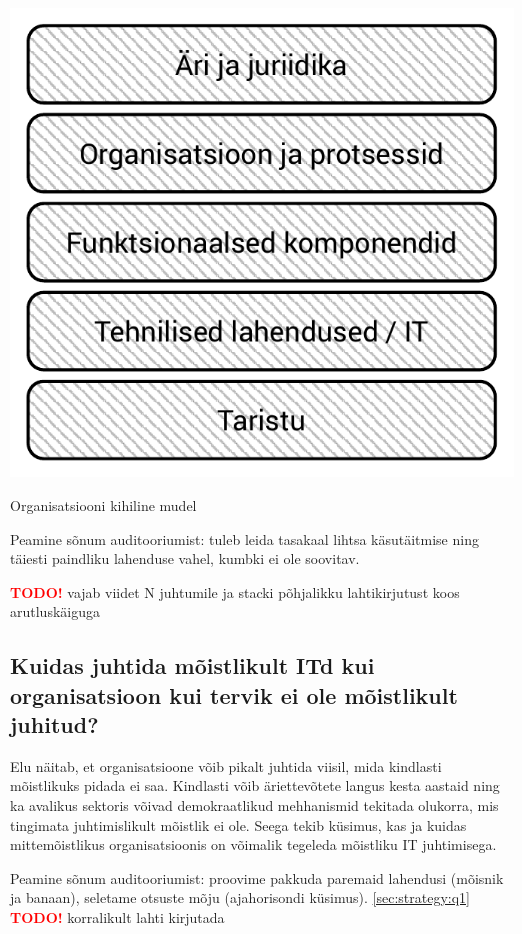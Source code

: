 \documentclass{tufte-book}
\newcommand{\TODO}{\textcolor{red}{\bf TODO!}\xspace}
\begin{document}
\begin{marginfigure}
	\begin{center}
		\includegraphics[width=\linewidth]{stack.pdf}
		\caption{Organisatsiooni kihiline mudel}
		\label{fig:stack}
	\end{center}
\end{marginfigure}

Peamine sõnum auditooriumist: tuleb leida tasakaal lihtsa käsutäitmise ning täiesti paindliku lahenduse vahel, kumbki ei ole soovitav.

\TODO vajab viidet N juhtumile ja stacki põhjalikku lahtikirjutust koos arutluskäiguga

\subsection{Kuidas juhtida mõistlikult ITd kui organisatsioon kui tervik ei ole mõistlikult juhitud?}
\label{sec:strategy:q3}
Elu näitab, et organisatsioone võib pikalt juhtida viisil, mida kindlasti mõistlikuks pidada ei saa. Kindlasti võib äriettevõtete langus kesta aastaid ning ka avalikus sektoris võivad demokraatlikud mehhanismid tekitada olukorra, mis tingimata juhtimislikult mõistlik ei ole. Seega tekib küsimus, kas ja kuidas mittemõistlikus organisatsioonis on võimalik tegeleda mõistliku IT juhtimisega.

Peamine sõnum auditooriumist: proovime pakkuda paremaid lahendusi (mõisnik ja banaan), seletame otsuste mõju (ajahorisondi küsimus).
\ref{sec:strategy:q1}
\TODO korralikult lahti kirjutada
\end{document}
